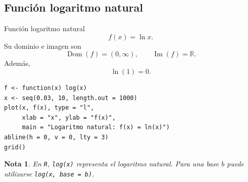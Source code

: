 \documentclass[aspectratio=169,10pt]{beamer}
\newtheorem{nota}{Nota}
\newcommand{\R}{\mathbb{R}}
\newcommand{\Dom}{\operatorname{Dom}}
\newcommand{\Ima}{\operatorname{Im}}
\begin{document}
\subsection{Función logaritmo natural}
\begin{frame}{Función logaritmo natural}
\[
f(x)=\ln x.
\]
Su dominio e imagen son
\[
\Dom(f)=(0,\infty),
\qquad
\Ima(f)=\R.
\]
Además,
\[
\ln(1)=0.
\]

\begin{center}
\end{center}

\begin{verbatim}
f <- function(x) log(x)
x <- seq(0.03, 10, length.out = 1000)
plot(x, f(x), type = "l",
     xlab = "x", ylab = "f(x)",
     main = "Logaritmo natural: f(x) = ln(x)")
abline(h = 0, v = 0, lty = 3)
grid()
\end{verbatim}

\begin{nota}
En \texttt{R}, \texttt{log(x)} representa el logaritmo natural. Para una base
$b$ puede utilizarse \texttt{log(x, base = b)}.
\end{nota}

\end{frame}
\end{document}
